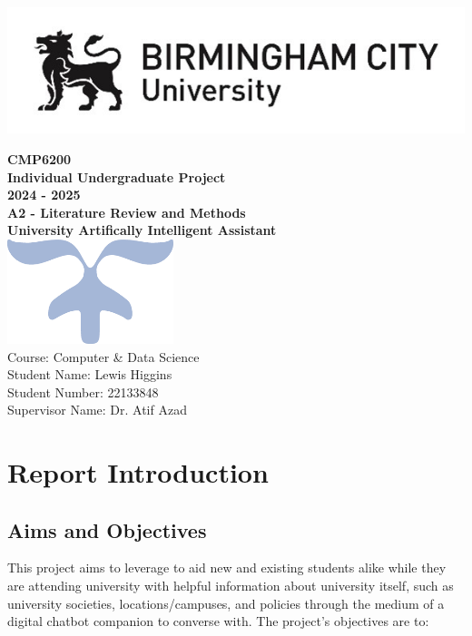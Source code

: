\documentclass[12pt]{report}
\begin{document}
    \makeatletter
    \begin{titlepage}
        \includegraphics[width=0.3\linewidth]{BCUWide.jpg}\\[4ex]
        \vspace{1cm}
        \begin{center}
            {\huge \bfseries  CMP6200}\\[2ex]
            {\huge \bfseries  Individual Undergraduate Project}\\[2ex]
            {\huge \bfseries 2024 - 2025}\\[6ex]
            {\large \bfseries A2 - Literature Review and Methods}\\[10ex]
            {\huge \bfseries University Artifically Intelligent Assistant}\\[6ex]
            \includegraphics[width=0.1\linewidth]{Symbol.png}\\[40ex]
            Course: Computer \& Data Science\\
            Student Name: Lewis Higgins\\
            Student Number: 22133848\\
            Supervisor Name: Dr. Atif Azad
        \end{center}
    \end{titlepage}
    \makeatother
    \thispagestyle{empty}
    \newpage

    \tableofcontents

    \chapter{Report Introduction}\label{ch:introduction}
    \section{Aims and Objectives}

    \noindent
    This project aims to leverage to aid new and existing students alike while they are attending university with 
    helpful information about university itself, such as university societies, locations/campuses, 
    and policies through the medium of a digital chatbot companion to converse with.
    The project's objectives are to:
\end{document}

